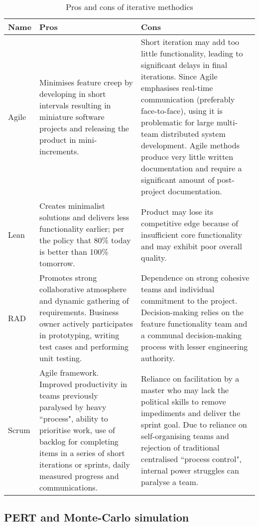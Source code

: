 \begin{longtable}{|p{}|p{}|p{}|}
\caption{Pros and cons of iterative methodics}\label{tab:prosconsitmet} \\
	\hline
	\textbf{Name} & \textbf{Pros} & \textbf{Cons} \\
	\hline
	\endhead
	Agile 
	& Minimises feature creep by developing in short intervals resulting in miniature software projects and releasing the product in mini-increments. 
	& Short iteration may add too little functionality, leading to significant delays in final iterations. Since Agile emphasises real-time communication (preferably face-to-face), using it is problematic for large multi-team distributed system development. Agile methods produce very little written documentation and require a significant amount of post-project documentation. \\
	\hline
	Lean 
	& Creates minimalist solutions and delivers less functionality earlier; per the policy that 80\% today is better than 100\% tomorrow. 
	& Product may lose its competitive edge because of insufficient core functionality and may exhibit poor overall quality. \\
	\hline
	RAD 
	& Promotes strong collaborative atmosphere and dynamic gathering of requirements. Business owner actively participates in prototyping, writing test cases and performing unit testing. 
	& Dependence on strong cohesive teams and individual commitment to the project. Decision-making relies on the feature functionality team and a communal decision-making process with lesser engineering authority. \\
	\hline
	Scrum 
	& Agile framework. Improved productivity in teams previously paralysed by heavy ``process", ability to prioritise work, use of backlog for completing items in a series of short iterations or sprints, daily measured progress and communications. 
	& Reliance on facilitation by a master who may lack the political skills to remove impediments and deliver the sprint goal. Due to reliance on self-organising teams and rejection of traditional centralised ``process control", internal power struggles can paralyse a team. \\
	\hline
\end{longtable}

\subsection{PERT and Monte-Carlo simulation}
\label{sec:pert}

